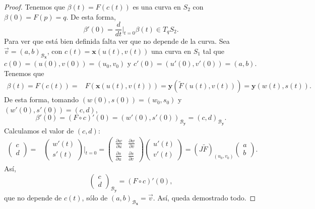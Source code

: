 \begin{proof}
Tenemos que $\displaystyle \beta\left(t\right)=F\left(c\left(t\right)\right) $ es una curva en $\displaystyle S_{2} $ con $\displaystyle \beta\left(0\right)=F\left(p\right)=q $. De esta forma, 
	\[\beta'\left(0\right)=\frac{d}{dt}|_{t = 0}\beta\left(t\right)\in T_{q}S_{2} .\]
	Para ver que está bien definida falta ver que no depende de la curva. Sea $\displaystyle \vec{v} = \left(a,b\right)_{ \mathcal{B}_{ \textbf{x} }} $, con $\displaystyle c\left(t\right)= \textbf{x} \left(u\left(t\right), v\left(t\right)\right) $ una curva en $\displaystyle S_{1} $ tal que $\displaystyle c\left(0\right)=\left(u\left(0\right), v\left(0\right)\right)=\left(u_{0}, v_{0}\right) $ y $\displaystyle c'\left(0\right)=\left(u'\left(0\right), v'\left(0\right)\right) = \left(a,b\right) $. Tenemos que 
	\[
	\begin{split}
		\beta\left(t \right)=F\left(c\left(t\right)\right)= & F\left( \textbf{x} \left(u\left(t\right), v\left(t\right)\right)\right) = \textbf{y} \left(\tilde{F}\left(u\left(t\right), v\left(t\right)\right)\right) = \textbf{y} \left(w\left(t\right), s\left(t\right)\right) .
	\end{split}
	\]
	De esta forma, tomando $\displaystyle \left(w\left(0\right), s\left(0\right)\right)=\left(w_{0}, s_{0}\right) $ y $\displaystyle \left(w'\left(0\right), s'\left(0\right)\right)=\left(c,d\right) $,
	\[\beta'\left(0\right)=\left(F\circ c\right)'\left(0\right)=\left(w'\left(0\right), s'\left(0\right)\right)_{\mathcal{B}_{ \textbf{y} }} = \left(c,d\right) _{\mathcal{B}_{ \textbf{y} }} .\]
Calculamos el valor de $\displaystyle \left(c,d\right) $:
\[
\begin{split}
	\begin{pmatrix} c \\ d \end{pmatrix} = & \begin{pmatrix} w'\left(t\right) \\ s'\left(t\right) \end{pmatrix}|_{t = 0} = \begin{pmatrix} \frac{\partial w}{\partial u} & \frac{\partial w}{\partial v} \\ \frac{\partial s}{\partial u} & \frac{\partial s}{\partial v} \end{pmatrix}\begin{pmatrix} u'\left(t\right) \\ v'\left(t\right) \end{pmatrix} = \left(J\tilde{F}\right)_{\left(u_{0}, v_{0}\right)}\begin{pmatrix} a \\ b \end{pmatrix} .
\end{split}
\]
Así, 
\[\begin{pmatrix} c \\ d \end{pmatrix}_{ \mathcal{B}_{ \textbf{y} }}=\left(F\circ c\right)'\left(0\right) ,\]
que no depende de $\displaystyle c\left(t\right) $, sólo de $\displaystyle \left(a,b\right)_{\mathcal{B}_{ \textbf{x} }}=\vec{v} $. Así, queda demostrado todo.
\end{proof}
